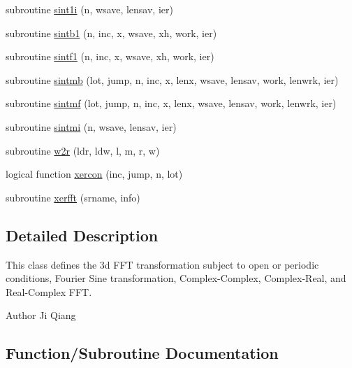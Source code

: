 \begin{DoxyCompactItemize}
\item 
subroutine \mbox{\hyperlink{namespacefftclass_ae156ccdcf953af967a42d20df0ddb725}{sint1i}} (n, wsave, lensav, ier)
\item 
subroutine \mbox{\hyperlink{namespacefftclass_af29f41f086c8e8901df2716d0b86db20}{sintb1}} (n, inc, x, wsave, xh, work, ier)
\item 
subroutine \mbox{\hyperlink{namespacefftclass_aa79de4b10a068408990ac9ac8f32d134}{sintf1}} (n, inc, x, wsave, xh, work, ier)
\item 
subroutine \mbox{\hyperlink{namespacefftclass_a4d9b6f96810b5b7a8b7dd38af74f5b55}{sintmb}} (lot, jump, n, inc, x, lenx, wsave, lensav, work, lenwrk, ier)
\item 
subroutine \mbox{\hyperlink{namespacefftclass_a497c6a39bac7daa7973b53cb00ffd6c3}{sintmf}} (lot, jump, n, inc, x, lenx, wsave, lensav, work, lenwrk, ier)
\item 
subroutine \mbox{\hyperlink{namespacefftclass_a9b28ecda04690fe2a4425da2b5625e4d}{sintmi}} (n, wsave, lensav, ier)
\item 
subroutine \mbox{\hyperlink{namespacefftclass_af191171f5e31fbad6c0e224faaf6175e}{w2r}} (ldr, ldw, l, m, r, w)
\item 
logical function \mbox{\hyperlink{namespacefftclass_a16b89da06cf17773f6b5aec6883952c2}{xercon}} (inc, jump, n, lot)
\item 
subroutine \mbox{\hyperlink{namespacefftclass_a3e1884f0fa20142f45f2d3efe3246adc}{xerfft}} (srname, info)
\end{DoxyCompactItemize}


\subsection{Detailed Description}
This class defines the 3d F\+FT transformation subject to open or periodic conditions, Fourier Sine transformation, Complex-\/\+Complex, Complex-\/\+Real, and Real-\/\+Complex F\+FT. 

\begin{DoxyAuthor}{Author}
Ji Qiang 
\end{DoxyAuthor}


\subsection{Function/\+Subroutine Documentation}
\mbox{\label{namespacefftclass_a5b4381756639205cdda3aa66b4d3e98c}} 
